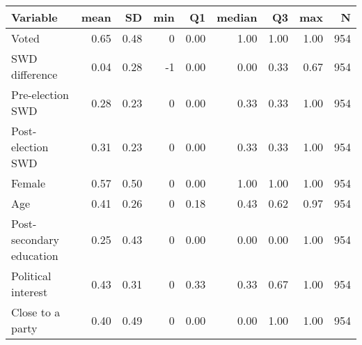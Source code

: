 
\begin{tabular}{l|r|r|r|r|r|r|r|r}
\hline
Variable & mean & SD & min & Q1 & median & Q3 & max & N\\
\hline
Voted & 0.65 & 0.48 & 0 & 0.00 & 1.00 & 1.00 & 1.00 & 954\\
\hline
SWD difference & 0.04 & 0.28 & -1 & 0.00 & 0.00 & 0.33 & 0.67 & 954\\
\hline
Pre-election SWD & 0.28 & 0.23 & 0 & 0.00 & 0.33 & 0.33 & 1.00 & 954\\
\hline
Post-election SWD & 0.31 & 0.23 & 0 & 0.00 & 0.33 & 0.33 & 1.00 & 954\\
\hline
Female & 0.57 & 0.50 & 0 & 0.00 & 1.00 & 1.00 & 1.00 & 954\\
\hline
Age & 0.41 & 0.26 & 0 & 0.18 & 0.43 & 0.62 & 0.97 & 954\\
\hline
Post-secondary education & 0.25 & 0.43 & 0 & 0.00 & 0.00 & 0.00 & 1.00 & 954\\
\hline
Political interest & 0.43 & 0.31 & 0 & 0.33 & 0.33 & 0.67 & 1.00 & 954\\
\hline
Close to a party & 0.40 & 0.49 & 0 & 0.00 & 0.00 & 1.00 & 1.00 & 954\\
\hline
\end{tabular}
